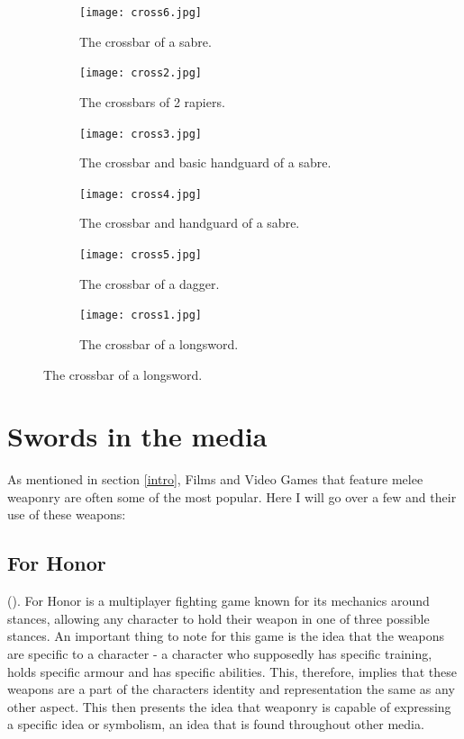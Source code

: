 \documentclass{article}
\begin{document}
\begin{figure}[H]
    \centering
    \caption{A collection of crossguards from various blades}
    \label{fig:Crossguards}
    \begin{subfigure}{0.3\textwidth}
        \centering
        \texttt{[image: cross6.jpg]}
        \caption{The crossbar of a sabre.}
        \label{fig:Cross1}
    \end{subfigure}
        \begin{subfigure}{0.3\textwidth}
        \centering
        \texttt{[image: cross2.jpg]}
        \caption{The crossbars of 2 rapiers.}
        \label{fig:Cross2}
    \end{subfigure}
        \begin{subfigure}{0.3\textwidth}
        \centering
        \texttt{[image: cross3.jpg]}
        \caption{The crossbar and basic handguard of a sabre.}
        \label{fig:Cross3}
    \end{subfigure}
        \begin{subfigure}{0.3\textwidth}
        \centering
        \texttt{[image: cross4.jpg]}
        \caption{The crossbar and handguard of a sabre.}
        \label{fig:Cross4}
    \end{subfigure}
        \begin{subfigure}{0.3\textwidth}
        \centering
        \texttt{[image: cross5.jpg]}
        \caption{The crossbar of a dagger.}
        \label{fig:Cross5}
    \end{subfigure}
        \begin{subfigure}{0.3\textwidth}
        \centering
        \texttt{[image: cross1.jpg]}
        \caption{The crossbar of a longsword.}
        \label{fig:Cross6}
    \end{subfigure}
\end{figure}

\pagebreak

\section{Swords in the media} \label{media}
As mentioned in section \ref{intro}, Films and Video Games that feature melee weaponry are often some of the most popular. Here I will go over a few and their use of these weapons:

\subsection{For Honor}
().
For Honor is a multiplayer fighting game known for its mechanics around stances, allowing any character to hold their weapon in one of three possible stances. An important thing to note for this game is the idea that the weapons are specific to a character - a character who supposedly has specific training, holds specific armour and has specific abilities. This, therefore, implies that these weapons are a part of the characters identity and representation the same as any other aspect. This then presents the idea that weaponry is capable of expressing a specific idea or symbolism, an idea that is found throughout other media.
\end{document}
